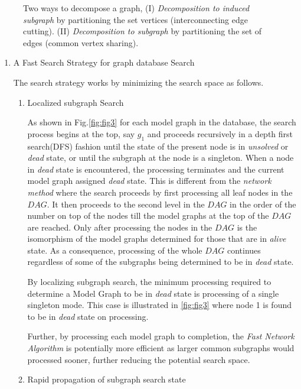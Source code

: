 \begin{figure}
\centering

\caption{Two ways to decompose a graph, (I) \textit{Decomposition to induced subgraph} by partitioning the set vertices (interconnecting edge cutting). (II) \textit{Decomposition to subgraph} by partitioning the set of edges (common vertex sharing).}
\label{fig:fig55}
\end{figure}

\begin{enumerate}

\item A Fast Search Strategy for graph database Search

The search strategy works by minimizing the search space as follows.
\begin{enumerate}
\item{Localized subgraph Search}

As shown in Fig.\ref{fig:fig3} for each model graph in the database, the search process begins at the top, say $g_1$ and proceeds recursively in a depth first search(DFS) fashion until the state of the present node is in \textit{unsolved} or \textit{dead} state, or until the subgraph at the node is a singleton. When a node in \textit{dead} state is encountered, the processing terminates and the current model graph assigned \textit{dead} state. This is different from the \textit{network method} where the search proceeds by first processing all leaf nodes in the $DAG$. It then proceeds to the second level in the $DAG$ in the order of the number on top of the nodes till the model graphs at the top of the $DAG$ are reached. Only after processing the nodes in the $DAG$ is the isomorphism of the model graphs determined for those that are in  \textit{alive} state. As a consequence, processing of the whole $DAG$ continues regardless of some of the subgraphs being determined to be in \textit{dead} state.

By localizing subgraph search, the minimum processing required to determine a Model Graph to be in \textit{dead} state is processing of a single singleton mode. This case is illustrated in \ref{fig:fig3} where node 1 is found to be in \textit{dead} state on processing.

Further, by processing each model graph to completion, the \textit{Fast Network Algorithm} is potentially more efficient as larger common subgraphs would processed sooner, further reducing the potential search space.

\item{Rapid propagation of subgraph search state}


\end{enumerate}
\end{enumerate}
